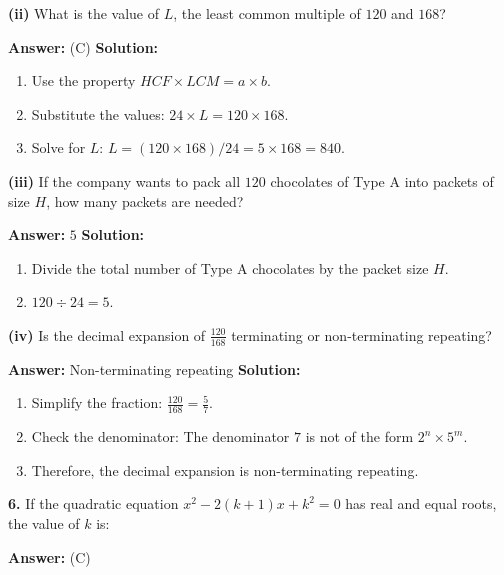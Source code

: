 \documentclass[12pt,a4paper]{exam}
\begin{document}
\begin{questions}
\textbf{(ii)} What is the value of $L$, the least common multiple of $120$ and $168$?

\textbf{Answer:} (C)
\textbf{Solution:}
\begin{enumerate}
  \item Use the property $HCF \times LCM = a \times b$.
  \item Substitute the values: $24 \times L = 120 \times 168$.
  \item Solve for $L$: $L = (120 \times 168) / 24 = 5 \times 168 = 840$.
\end{enumerate}

\textbf{(iii)} If the company wants to pack all $120$ chocolates of Type A into packets of size $H$, how many packets are needed?

\textbf{Answer:} $5$
\textbf{Solution:}
\begin{enumerate}
  \item Divide the total number of Type A chocolates by the packet size $H$.
  \item $120 \div 24 = 5$.
\end{enumerate}

\textbf{(iv)} Is the decimal expansion of $\frac{120}{168}$ terminating or non-terminating repeating?

\textbf{Answer:} Non-terminating repeating
\textbf{Solution:}
\begin{enumerate}
  \item Simplify the fraction: $\frac{120}{168} = \frac{5}{7}$.
  \item Check the denominator: The denominator $7$ is not of the form $2^n \times 5^m$.
  \item Therefore, the decimal expansion is non-terminating repeating.
\end{enumerate}

\vspace{0.3cm}

\question \textbf{6.} If the quadratic equation $x^2 - 2(k+1)x + k^2 = 0$ has real and equal roots, the value of $k$ is:

\textbf{Answer:}
(C)


\end{questions}
\end{document}

